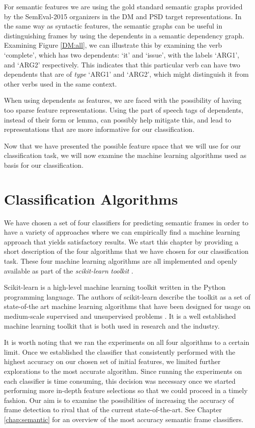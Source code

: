 For semantic features we are using the gold standard semantic graphs provided by the SemEval-2015 organizers in the DM and PSD target representations. In the same way as syntactic features, the semantic graphs can be useful in distinguishing frames by using the dependents in a semantic dependency graph. Examining Figure \ref{DM:all}, we can illustrate this by examining the verb `complete', which has two dependents: `it' and `issue', with the labels `ARG1', and `ARG2' respectively. This indicates that this particular verb can have two dependents that are of \textit{type} `ARG1' and `ARG2', which might distinguish it from other verbs used in the same context. 

When using dependents as features, we are faced with the possibility of having too sparse feature representations. Using the part of speech tags of dependents, instead of their form or lemma, can possibly help mitigate this, and lead to representations that are more informative for our classification.

Now that we have presented the possible feature space that we will use for our classification task, we will now examine the machine learning algorithms used as basis for our classification.

 
\section{Classification Algorithms}

We have chosen a set of four classifiers for predicting semantic frames in order to have a variety of approaches where we can empirically find a machine learning approach that yields satisfactory results. We start this chapter by providing a short description of the four algorithms that we have chosen for our classification task. These four machine learning algorithms are all implemented and openly available as part of the \textit{scikit-learn toolkit} \cite{scikit-learn}.

Scikit-learn is a high-level machine learning toolkit written in the Python programming language. The authors of scikit-learn describe the toolkit as a set of state-of-the art machine learning algorithms that have been designed for usage on medium-scale supervised and unsupervised problems \cite{scikit-learn}. It is a well established machine learning toolkit that is both used in research and the industry.

It is worth noting that we ran the experiments on all four algorithms to a certain limit. Once we established the classifier that consistently performed with the highest accuracy on our chosen set of initial features, we limited further explorations to the most accurate algorithm. Since running the experiments on each classifier is time consuming, this decision was necessary once we started performing more in-depth feature selections so that we could proceed in a timely fashion. Our aim is to examine the possibilities of increasing the accuracy of frame detection to rival that of the current state-of-the-art. See Chapter \ref{chap:semantic} for an overview of the most accuracy semantic frame classifiers.

